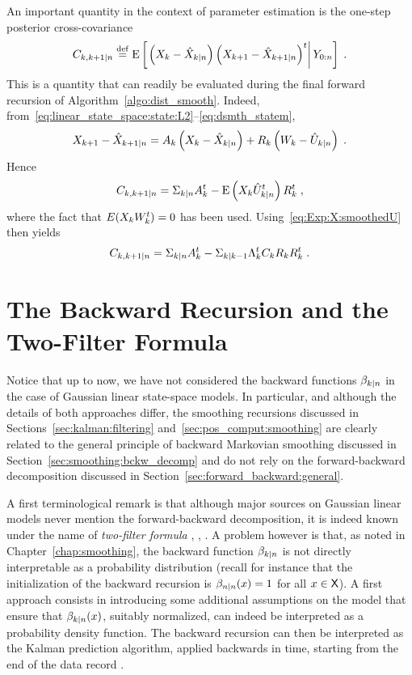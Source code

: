 \begin{rem}
  \label{rem:smoothed_X_Xp1}
  An important quantity in the context of parameter estimation  is the
  one-step posterior cross-covariance
  \begin{equation}
    \label{eq:C_k_kp1:def}
    C_{k,k+1|n} \eqdef \PE \left[\left. \left(X_k-\projx{\X}{k}{n}\right)\left(X_{k+1}-\projx{\X}{k+1}{n}\right)^t\right|\chunk{\Y}{0}{n}\right] \eqsp .
  \end{equation}
  This is a quantity that can readily be evaluated during the final forward
  recursion of Algorithm~\ref{algo:dist_smooth}. Indeed,
  from~\eqref{eq:linear_state_space:state:L2}--\eqref{eq:dsmth_statem},
  \[
    X_{k+1}-\hat{X}_{k+1|n} = A_k \left(X_{k}-\hat{X}_{k|n}\right) + R_k \left(W_k - \hat{U}_{k|n}\right) \; .
  \]
  Hence
  \[
    C_{k,k+1|n} = \Sigma_{k|n} A_k^t -\operatorname{E}\left(X_k\hat{U}_{k|n}^t\right) R_k^t \; ,
  \]
  where the fact that $E(X_kW_k^t)=0$ has been used. Using~\eqref{eq:Exp:X:smoothedU} then yields
  \begin{equation}
    \label{eq:smoothed_X_Xp1}
    C_{k,k+1|n} = \Sigma_{k|n} A_k^t - \Sigma_{k|k-1} \Lambda_{k}^t C_k R_k R_k^t \; .
  \end{equation}
\end{rem}

\section{The Backward Recursion and the Two-Filter Formula}
\label{sec:LGSSM:two-filter}
Notice that up to now, we have not considered the backward functions $\beta_{k|n}$
in the case of Gaussian linear state-space models. In particular, and although
the details of both approaches differ, the smoothing recursions discussed in
Sections~\ref{sec:kalman:filtering} and~\ref{sec:pos_comput:smoothing} are
clearly related to the general principle of backward Markovian smoothing
discussed in Section~\ref{sec:smoothing:bckw_decomp} and do not rely on the
forward-backward decomposition discussed in
Section~\ref{sec:forward_backward:general}.

A first terminological remark is that although major sources on Gaussian linear
models never mention the forward-backward decomposition, it is indeed known
under the name of \emph{two-filter formula}
\cite[Section 10.4]{fraser:potter:1969}, \cite{kitagawa:1996}, \cite{kailath:sayed:hassibi:2000}.
A problem however is that, as noted in Chapter~\ref{chap:smoothing}, the backward
function $\beta_{k|n}$ is not directly interpretable as a probability
distribution (recall for instance that the initialization of the backward
recursion is $\beta_{n|n}(x) = 1$ for all $x \in \mathsf{X}$). A first approach
consists in introducing some additional assumptions on the model that ensure
that $\beta_{k|n}(x)$, suitably normalized, can indeed be interpreted as a
probability density function. The backward recursion can then be interpreted as
the Kalman prediction algorithm, applied backwards in time, starting from the
end of the data record \cite[Section 10.4]{kailath:sayed:hassibi:2000}.

